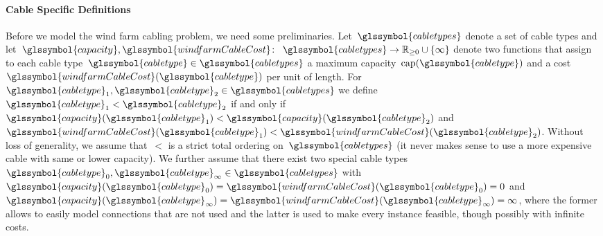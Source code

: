 \paragraph{Cable Specific Definitions}
\label{ch:wfcp:sec:model:para:cable-specific-definition}
% 
Before we model the wind farm cabling problem, we need some preliminaries.
Let~$\glssymbol{cabletypes}$ denote a set of cable types and
let~$\glssymbol{capacity}, \glssymbol{windfarmCableCost} \colon$ $
\glssymbol{cabletypes} \to \posreals \cup \{\infty\}$ denote two functions that
assign to each cable type~$\glssymbol{cabletype} \in \glssymbol{cabletypes}$ a
maximum capacity~$\capacity(\glssymbol{cabletype})$ and a
cost~$\glssymbol{windfarmCableCost}(\glssymbol{cabletype})$ per unit of length.
For~$\glssymbol{cabletype}_{1},\glssymbol{cabletype}_{2} \in
\glssymbol{cabletypes}$ we define~$\glssymbol{cabletype}_{1} <
\glssymbol{cabletype}_{2}$ if and only
if~\mbox{$\glssymbol{capacity}(\glssymbol{cabletype}_{1}) <
\glssymbol{capacity}(\glssymbol{cabletype}_{2})$}
and~$\glssymbol{windfarmCableCost}(\glssymbol{cabletype}_{1}) <
\glssymbol{windfarmCableCost}(\glssymbol{cabletype}_{2})$.  Without loss of
generality, we assume that~$<$ is a strict total ordering
on~$\glssymbol{cabletypes}$ (it never makes sense to use a more expensive cable
with same or lower capacity). We further assume that there exist two special
cable types~$\glssymbol{cabletype}_{0},
\glssymbol{cabletype}_{{\infty}} \in \glssymbol{cabletypes}$ with~$
\glssymbol{capacity}(\glssymbol{cabletype}_{0}) 
=
\glssymbol{windfarmCableCost}(\glssymbol{cabletype}_{0}) 
= 
0$ and~$
\glssymbol{capacity}(\glssymbol{cabletype}_{\infty}) 
=
\glssymbol{windfarmCableCost}(\glssymbol{cabletype}_{\infty}) 
= 
\infty
$, where the former allows to easily model connections that are not used and the
latter is used to make every instance feasible, though possibly with infinite
costs.
% 

